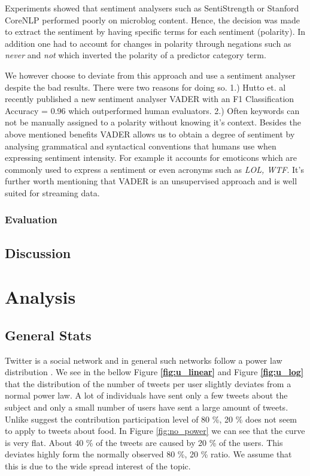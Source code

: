 Experiments showed that sentiment analysers such as SentiStrength \cite{sent10} or Stanford CoreNLP \cite{stanford2011} performed  poorly on microblog content. Hence, the decision was made to extract the sentiment by having specific terms for each sentiment (polarity). In addition one had to account for changes in polarity through negations such as \emph{never} and \emph{not} which inverted the polarity of a predictor category term. 

We however choose to deviate from this approach and use a sentiment analyser despite the bad results. There were two reasons for doing so. 1.) Hutto et. al recently published a new sentiment analyser VADER \cite{hutton14} with an F1 Classification Accuracy = 0.96 which  outperformed human evaluators. 2.) Often keywords can not be manually assigned to a polarity without knowing it's context. Besides the above mentioned benefits VADER allows us to obtain a degree of sentiment by analysing grammatical and syntactical conventions that humans use when expressing sentiment intensity. For example it accounts for emoticons which are commonly used to express a sentiment or even acronyms such as \emph{LOL, WTF}. It's further worth mentioning that VADER is an unsupervised approach and is well suited for streaming data. 


\subsection{Evaluation}






\section {Discussion}




\chapter{Analysis}

\section{General Stats}

Twitter is a social network and in general such networks follow a power law distribution \cite{Whittaker:1998}. We see in the bellow Figure \textbf{\ref{fig:u_linear}} and Figure \textbf{\ref{fig:u_log}}  that the distribution of the number of tweets per user slightly deviates from a normal power law. A lot of individuals have sent only a few tweets about the subject and only a small number of users have sent a large amount of tweets. Unlike \cite{bild15} suggest the contribution participation level of  80 \%, 20 \%   does not seem to apply to tweets about food. In Figure \ref{fig:no_power} we can see that the curve is very flat. About 40 \% of the tweets are caused by 20 \% of the users. This deviates highly form the normally observed 80 \%, 20 \% ratio. We assume that this is due to the wide spread interest of the topic.

